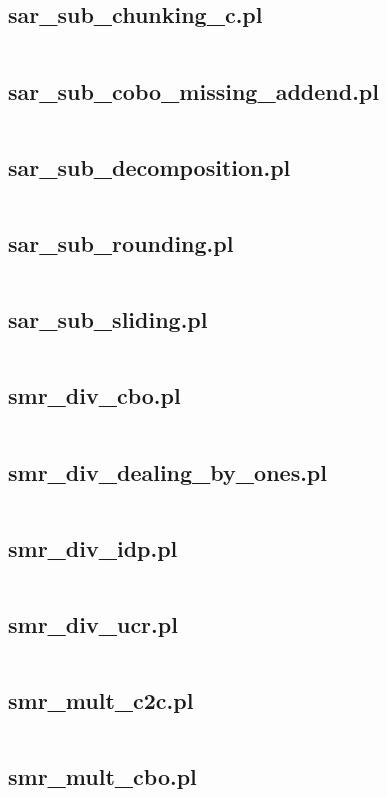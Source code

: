 \documentclass{article}
\begin{document}
\subsection{sar\_sub\_chunking\_c.pl}
\inputminted{prolog}{sar_sub_chunking_c.pl}
\subsection{sar\_sub\_cobo\_missing\_addend.pl}
\inputminted{prolog}{sar_sub_cobo_missing_addend.pl}
\subsection{sar\_sub\_decomposition.pl}
\inputminted{prolog}{sar_sub_decomposition.pl}
\subsection{sar\_sub\_rounding.pl}
\inputminted{prolog}{sar_sub_rounding.pl}
\subsection{sar\_sub\_sliding.pl}
\inputminted{prolog}{sar_sub_sliding.pl}
\subsection{smr\_div\_cbo.pl}
\inputminted{prolog}{smr_div_cbo.pl}
\subsection{smr\_div\_dealing\_by\_ones.pl}
\inputminted{prolog}{smr_div_dealing_by_ones.pl}
\subsection{smr\_div\_idp.pl}
\inputminted{prolog}{smr_div_idp.pl}
\subsection{smr\_div\_ucr.pl}
\inputminted{prolog}{smr_div_ucr.pl}
\subsection{smr\_mult\_c2c.pl}
\inputminted{prolog}{smr_mult_c2c.pl}
\subsection{smr\_mult\_cbo.pl}
\inputminted{prolog}{smr_mult_cbo.pl}
\end{document}
